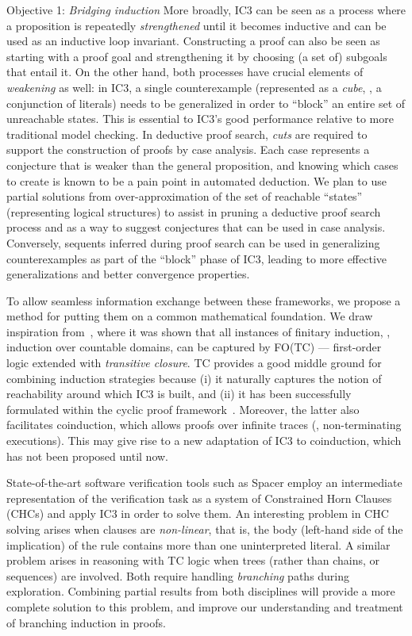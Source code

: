\begin{paragraph}{Objective 1: {\it Bridging induction}}
More broadly, IC3 can be seen as a process where a proposition is repeatedly \emph{strengthened} until it becomes inductive and can be used as an inductive loop invariant.
Constructing a proof can also be seen as starting with a proof goal and strengthening it by choosing (a set of) subgoals that entail it.
On the other hand, both processes have crucial elements of \emph{weakening} as well: in IC3, a single counterexample (represented as a \emph{cube}, \ie, a conjunction of literals) needs to be generalized in order to ``block'' an entire set of unreachable states.
This is essential to IC3's good performance relative to more traditional model checking.
In deductive proof search, \emph{cuts} are required to support the construction of proofs by case analysis.
Each case represents a conjecture that is weaker than the general proposition, and knowing which  cases to create is known to be a pain point in automated deduction.
We plan to use partial solutions from over-approximation of the set of reachable ``states'' (representing logical structures) to assist in pruning a deductive proof search process and as a way to suggest conjectures that can be used in case analysis.
Conversely, sequents inferred during proof search can be used in generalizing counterexamples as part of the ``block'' phase of IC3, leading to more effective generalizations and better convergence properties.

To allow seamless information exchange between these frameworks, we propose a method for putting them on a common mathematical foundation.
We draw inspiration from~\cite{Book2003:Avron}, where it was shown that all instances of finitary induction, \ie, induction over countable domains, can be captured by FO(TC) --- first-order logic extended with \emph{transitive closure}.
TC provides a good middle ground for combining induction strategies because
(i) it naturally captures the notion of reachability around which IC3 is built, and
(ii) it has been successfully formulated within the cyclic proof framework~.
Moreover, the latter also facilitates coinduction, which allows proofs over infinite traces (\ie, non-terminating executions).
This may give rise to a new adaptation of IC3 to coinduction, which has not been proposed until now.

State-of-the-art software verification tools such as Spacer employ an intermediate representation of the verification task as a system of Constrained Horn Clauses (CHCs) and apply IC3 in order to solve them.
An interesting problem in CHC solving arises when clauses are \emph{non-linear}, that is, the body (left-hand side of the implication) of the rule contains more than one uninterpreted literal.
A similar problem arises in reasoning with TC logic when trees (rather than chains, or sequences) are involved.
Both require handling \emph{branching} paths during exploration.
Combining partial results from both disciplines will provide a more complete solution to this problem,
and improve our understanding and treatment of branching induction in proofs.


\end{paragraph}
